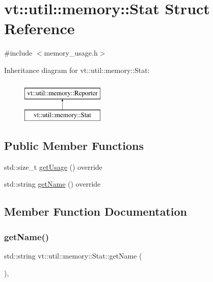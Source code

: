 \hypertarget{structvt_1_1util_1_1memory_1_1_stat}{}\section{vt\+:\+:util\+:\+:memory\+:\+:Stat Struct Reference}
\label{structvt_1_1util_1_1memory_1_1_stat}


{\ttfamily \#include $<$memory\+\_\+usage.\+h$>$}

Inheritance diagram for vt\+:\+:util\+:\+:memory\+:\+:Stat\+:\begin{figure}[H]
\begin{center}
\leavevmode
\includegraphics[height=2.000000cm]{structvt_1_1util_1_1memory_1_1_stat}
\end{center}
\end{figure}
\subsection*{Public Member Functions}
\begin{DoxyCompactItemize}
\item 
std\+::size\+\_\+t \hyperlink{structvt_1_1util_1_1memory_1_1_stat_aa14297e6605a523e4164597d45fba06f}{get\+Usage} () override
\item 
std\+::string \hyperlink{structvt_1_1util_1_1memory_1_1_stat_a2a29912688c89bcb98d6132ecda6070f}{get\+Name} () override
\end{DoxyCompactItemize}


\subsection{Member Function Documentation}
\mbox{\label{structvt_1_1util_1_1memory_1_1_stat_a2a29912688c89bcb98d6132ecda6070f}} 
\subsubsection{\texorpdfstring{get\+Name()}{getName()}}
{\footnotesize\ttfamily std\+::string vt\+::util\+::memory\+::\+Stat\+::get\+Name (\begin{DoxyParamCaption}{ }\end{DoxyParamCaption})\hspace{0.3cm}{\ttfamily [override]}, {\ttfamily [virtual]}}



